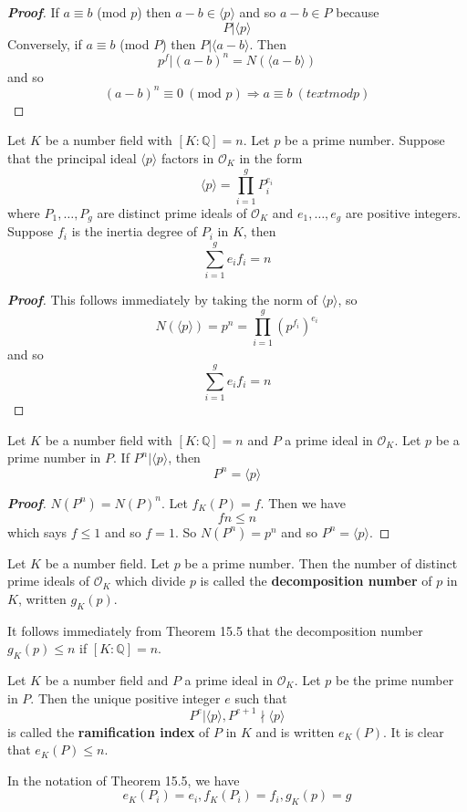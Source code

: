 \begin{proof}[\bf Proof] If $a \equiv b$ (mod $p$) then $a-b \in \langle p \rangle$ and so $a-b \in P$ because
$$P \big| \langle p \rangle$$
Conversely, if $a \equiv b$ (mod $P$) then $P \big| \langle a-b \rangle$. Then
$$p^f \big| (a-b)^n=N(\langle a-b \rangle)$$
and so
$$(a-b)^n \equiv 0~(\text{mod } p) \Rightarrow a \equiv b~(text{mod } p)$$
\end{proof}
\begin{theorem} Let $K$ be a number field with $[K:\mathbb{Q}]=n$. Let $p$ be a prime number. Suppose that the
principal ideal $\langle p \rangle$ factors in $\mathcal{O}_K$ in the form
$$\langle p \rangle=\prod_{i=1}^g P^{e_i}_i$$
where $P_1,\ldots,P_g$ are distinct prime ideals of $\mathcal{O}_K$ and $e_1,\ldots,e_g$ are positive integers.
Suppose $f_i$ is the inertia degree of $P_i$ in $K$, then
$$\sum_{i=1}^g e_i f_i=n$$
\end{theorem}
\begin{proof}[\bf Proof] This follows immediately by taking the norm of $\langle p \rangle$, so
$$N(\langle p \rangle)=p^n=\prod_{i=1}^g (p^{f_i})^{e_i}$$
and so
$$\sum_{i=1}^g e_i f_i=n$$
\end{proof}
\begin{corollary} Let $K$ be a number field with $[K:\mathbb{Q}]=n$ and $P$ a prime ideal in $\mathcal{O}_K$. Let $p$ be a prime number in $P$. If $P^n \big| \langle p \rangle$, then
$$P^n=\langle p \rangle$$
\end{corollary}
\begin{proof}[\bf Proof] $N(P^n)=N(P)^n$. Let $f_K(P)=f$. Then we have
$$fn \le n$$
which says $f \le 1$ and so $f=1$. So $N(P^n)=p^n$ and so $P^n=\langle p \rangle$.
\end{proof}
\begin{definition} Let $K$ be a number field. Let $p$ be a prime number. Then the number of distinct prime ideals of $\mathcal{O}_K$ which divide $p$ is called the {\bf decomposition number} of $p$ in $K$, written $g_K(p)$.
\end{definition}
It follows immediately from Theorem 15.5 that the decomposition number $g_K(p) \le n$ if $[K:\mathbb{Q}]=n$.
\begin{definition} Let $K$ be a number field and $P$ a prime ideal in $\mathcal{O}_K$. Let $p$ be the prime number
in $P$. Then the unique positive integer $e$ such that
$$P^e \big| \langle p \rangle, P^{e+1} \nmid \langle p \rangle$$
is called the {\bf ramification index} of $P$ in $K$ and is written $e_K(P)$. It is clear that $e_K(P) \le n$.
\end{definition}
In the notation of Theorem 15.5, we have
$$e_K(P_i)=e_i,f_K(P_i)=f_i,g_K(p)=g$$
